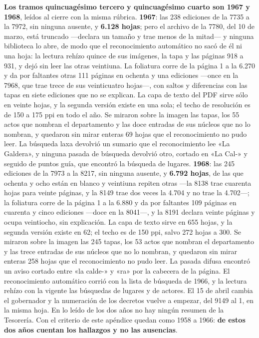 \textbf{Los tramos quincuagésimo tercero y quincuagésimo cuarto son 1967 y 1968}, leídos al cierre con la misma rúbrica. \textbf{1967}: las 238 ediciones de la 7735 a la 7972, sin ninguna ausente, y \textbf{6.128 hojas}; pero el archivo de la 7780, del 10 de marzo, está truncado ---declara un tamaño y trae menos de la mitad--- y ninguna biblioteca lo abre, de modo que el reconocimiento automático no sacó de él ni una hoja: la lectura rehízo quince de sus imágenes, la tapa y las páginas 918 a 931, y dejó sin leer las otras veintiuna. La foliatura corre de la página 1 a la 6.270 y da por faltantes otras 111 páginas en ochenta y una ediciones ---once en la 7968, que trae trece de sus veinticuatro hojas---, con saltos y diferencias con las tapas en siete ediciones que no se explican. La capa de texto del PDF sirve sólo en veinte hojas, y la segunda versión existe en una sola; el techo de resolución es de 150 a 175 ppi en todo el año. Se miraron sobre la imagen las tapas, los 55 actos que nombran el departamento y las doce entradas de sus núcleos que no lo nombran, y quedaron sin mirar enteras 69 hojas que el reconocimiento no pudo leer. La búsqueda laxa devolvió un sumario que el reconocimiento lee «La Galdera», y ninguna pasada de búsqueda devolvió otro, cortado en «La Cal-» y seguido de puntos guía, que encontró la búsqueda de lugares. \textbf{1968}: las 245 ediciones de la 7973 a la 8217, sin ninguna ausente, y \textbf{6.792 hojas}, de las que ochenta y ocho están en blanco y veintiuna repiten otras ---la 8138 trae cuarenta hojas para veinte páginas, y la 8149 trae dos veces la 4.704 y no trae la 4.702---; la foliatura corre de la página 1 a la 6.880 y da por faltantes 109 páginas en cuarenta y cinco ediciones ---doce en la 8041---, y la 8191 declara veinte páginas y ocupa veintiocho, sin explicación. La capa de texto sirve en 655 hojas, y la segunda versión existe en 62; el techo es de 150 ppi, salvo 272 hojas a 300. Se miraron sobre la imagen las 245 tapas, los 53 actos que nombran el departamento y las trece entradas de sus núcleos que no lo nombran, y quedaron sin mirar enteras 258 hojas que el reconocimiento no pudo leer. La pasada difusa encontró un aviso cortado entre «la calde-» y «ra» por la cabecera de la página. El reconocimiento automático corrió con la lista de búsqueda de 1966, y la lectura rehízo con la vigente las búsquedas de lugares y de actores. El 15 de abril cambia el gobernador y la numeración de los decretos vuelve a empezar, del 9149 al 1, en la misma hoja. En lo leído de los dos años no hay ningún resumen de la Tesorería. Con el criterio de este apéndice quedan como 1958 a 1966: \textbf{de estos dos años cuentan los hallazgos y no las ausencias}.

